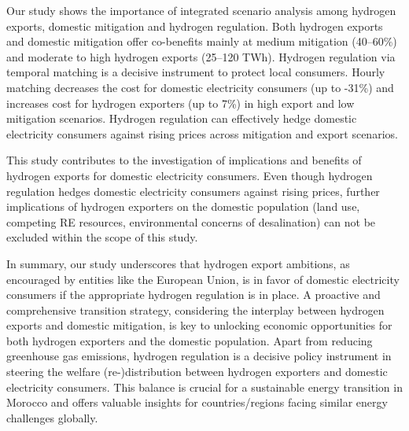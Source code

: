 



Our study shows the importance of integrated scenario analysis among hydrogen exports, domestic mitigation and hydrogen regulation.
Both hydrogen exports and domestic mitigation offer co-benefits mainly at medium mitigation (40--60\%) and moderate to high hydrogen exports (25--120 TWh). Hydrogen regulation via temporal matching is a decisive instrument
to protect local consumers. Hourly matching decreases the cost for domestic electricity consumers (up to -31\%) and increases cost for hydrogen exporters (up to 7\%) in high export and low mitigation scenarios. Hydrogen regulation can effectively hedge domestic electricity consumers against rising prices across mitigation and export scenarios. %

This study contributes to the investigation of 
implications and benefits of hydrogen exports for domestic electricity consumers. Even though hydrogen regulation hedges domestic electricity consumers against rising prices, further implications of hydrogen exporters on the domestic population (land use, competing RE resources, environmental concerns of desalination) can not be excluded within the scope of this study.

In summary, our study underscores that hydrogen export ambitions, as encouraged by entities like the European Union, is in favor of domestic electricity consumers 
if the appropriate hydrogen regulation is in place. A proactive and comprehensive transition strategy, considering the interplay between hydrogen exports and domestic mitigation, is key to unlocking economic opportunities for both hydrogen exporters and the domestic population. 
Apart from reducing greenhouse gas emissions, hydrogen regulation is a decisive policy instrument in steering the welfare (re-)distribution between hydrogen exporters and domestic electricity consumers. 
This balance is crucial for a sustainable energy transition in Morocco and offers valuable insights for countries/regions facing similar energy challenges globally.



